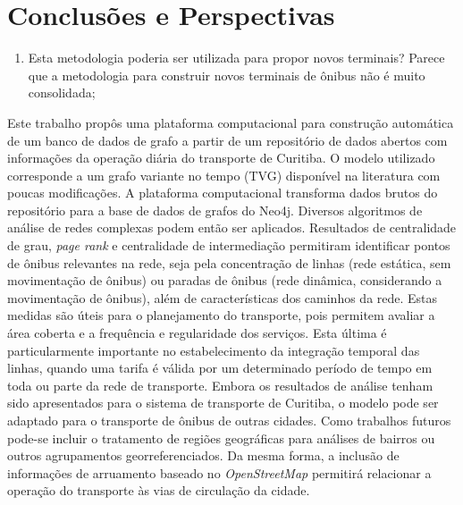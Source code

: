 
\chapter{Conclusões e Perspectivas}\label{cap:conclusoeseperspectivas}


\begin{enumerate}
    \item Esta metodologia poderia ser utilizada para propor novos terminais? Parece que a metodologia para construir novos terminais de ônibus não é muito consolidada;
\end{enumerate}

Este trabalho propôs uma plataforma computacional para construção automática de um banco de dados de grafo a partir de um repositório de dados abertos com informações da operação diária do transporte de Curitiba. O modelo utilizado corresponde a um grafo variante no tempo (TVG) disponível na literatura com poucas modificações. A plataforma computacional transforma dados brutos do repositório para a base de dados de grafos do Neo4j. Diversos algoritmos de análise de redes complexas podem então ser aplicados. Resultados de centralidade de grau, \emph{page rank} e centralidade de intermediação permitiram identificar pontos de ônibus relevantes na rede, seja pela concentração de linhas (rede estática, sem movimentação de ônibus) ou paradas de ônibus (rede dinâmica, considerando a movimentação de ônibus), além de características dos caminhos da rede. Estas medidas são úteis para o planejamento do transporte, pois permitem avaliar a área coberta e a frequência e regularidade dos serviços. Esta última é particularmente importante no estabelecimento da integração temporal das linhas, quando uma tarifa é válida por um determinado período de tempo em toda ou parte da rede de transporte. Embora os resultados de análise tenham sido apresentados para o sistema de transporte de Curitiba, o modelo pode ser adaptado para o transporte de ônibus de outras cidades. Como trabalhos futuros pode-se incluir o tratamento de regiões geográficas para análises de bairros ou outros agrupamentos georreferenciados. Da mesma forma, a inclusão de informações de arruamento baseado no \emph{OpenStreetMap} permitirá relacionar a operação do transporte às vias de circulação da cidade.
